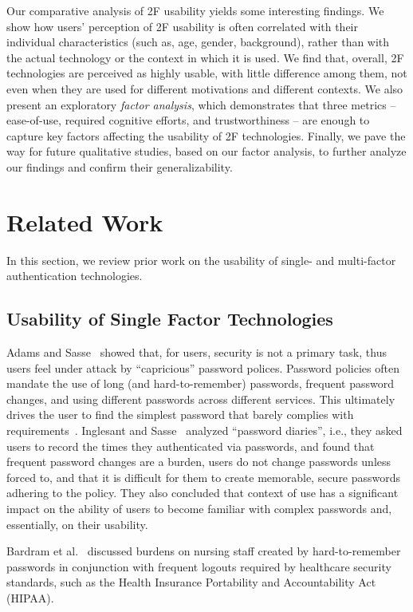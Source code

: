 \documentclass[conference]{IEEEtran}
\begin{document}
Our comparative analysis of 2F usability yields some interesting findings. We show how users' perception of 2F usability is often correlated with their individual characteristics (such as, age, gender, background), rather than with the actual technology or the context in which it is used.
We find that, overall, 2F technologies are perceived as highly usable, with little difference among them, not even when they are used for different motivations and different contexts. 
We also present an exploratory {\em factor analysis}, which demonstrates that three metrics -- ease-of-use, required cognitive efforts, and trustworthiness -- are enough to capture key factors affecting the usability of 2F technologies.
Finally, we pave the way for future qualitative studies, based on our factor analysis, to further analyze our findings and confirm their generalizability.


\section{Related Work}\label{sec:rw}
In this section, we review prior work on the usability of single- and multi-factor authentication technologies.

\subsection{Usability of Single Factor Technologies}
Adams and Sasse~\cite{adams1999users} showed that, for users, security is not a primary task, thus users feel under attack by ``capricious'' password polices. Password policies often mandate the use of long (and hard-to-remember) passwords, frequent password changes, and using different passwords across different services. This ultimately drives the user to find the simplest password that barely complies with requirements~\cite{adams1999users}. Inglesant and Sasse~\cite{inglesant2010true} analyzed ``password diaries'', i.e., they asked users to record the times they authenticated via passwords, and found that frequent password changes are a burden, users do not change passwords unless forced to, and that it is difficult for them to create memorable, secure passwords adhering to the policy. They also concluded that context of use has a significant impact on the ability of users to become familiar with complex passwords and, essentially, on their usability.

Bardram et al.~\cite{bardram2005trouble} discussed burdens on nursing staff created by hard-to-remember passwords in conjunction with frequent logouts required by healthcare security standards, such as the Health Insurance Portability and Accountability Act (HIPAA).
\end{document}
